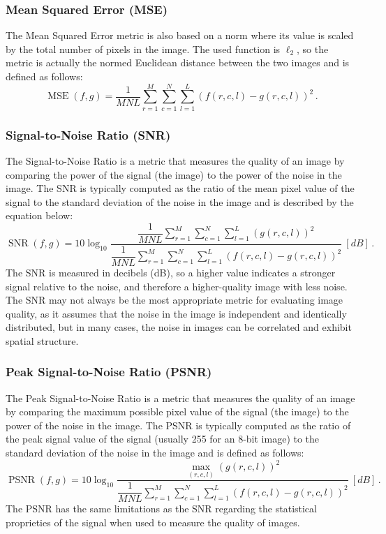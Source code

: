 \subsubsection*{Mean Squared Error (MSE)}
The Mean Squared Error metric is also based on a norm where its value is scaled by the total number of pixels in the image. The used function is $\ell_2$, so  the metric is actually the normed Euclidean distance between the two images and is defined as follows:
\begin{equation}
    \operatorname{MSE}(f, g) = \dfrac{1}{MNL} \sum\limits_{r=1}^{M}\sum\limits_{c=1}^{N}\sum\limits_{l=1}^{L} \left( f(r, c, l) - g(r, c, l) \right) ^ 2\,.
\end{equation}
\subsubsection*{Signal-to-Noise Ratio (SNR)}
The Signal-to-Noise Ratio is a metric that measures the quality of an image by comparing the power of the signal (the image) to the power of the noise in the image. The SNR is typically computed as the ratio of the mean pixel value of the signal to the standard deviation of the noise in the image and is described by the equation below:
\begin{equation}
    \operatorname{SNR}(f, g) = 10 \log_{10} \dfrac{\dfrac{1}{MNL}\sum\limits_{r=1}^{M}\sum\limits_{c=1}^{N}\sum\limits_{l=1}^{L} \left(g(r, c, l) \right) ^ 2}{\dfrac{1}{MNL}\sum\limits_{r=1}^{M}\sum\limits_{c=1}^{N}\sum\limits_{l=1}^{L} \left( f(r, c, l) - g(r, c, l) \right) ^ 2} \ [dB]\,.
\end{equation}
The SNR is measured in decibels (dB), so a higher value indicates a stronger signal relative to the noise, and therefore a higher-quality image with less noise. The SNR may not always be the most appropriate metric for evaluating image quality, as it assumes that the noise in the image is independent and identically distributed, but in many cases, the noise in images can be correlated and exhibit spatial structure.

\subsubsection*{Peak Signal-to-Noise Ratio (PSNR)}
The Peak Signal-to-Noise Ratio is a metric that measures the quality of an image by comparing the maximum possible pixel value of the signal (the image) to the power of the noise in the image. The PSNR is typically computed as the ratio of the peak signal value of the signal (usually 255 for an 8-bit image) to the standard deviation of the noise in the image and is defined as follows:
\begin{equation}
    \operatorname{PSNR}(f, g) = 10 \log_{10} \dfrac{\underset{(r, c, l)}{\max} \left(g(r, c, l) \right) ^ 2}{\dfrac{1}{MNL}\sum\limits_{r=1}^{M}\sum\limits_{c=1}^{N}\sum\limits_{l=1}^{L} \left( f(r, c, l) - g(r, c, l) \right) ^ 2} \ [dB]\,.
\end{equation}
The PSNR has the same limitations as the SNR regarding the statistical proprieties of the signal when used to measure the quality of images.


